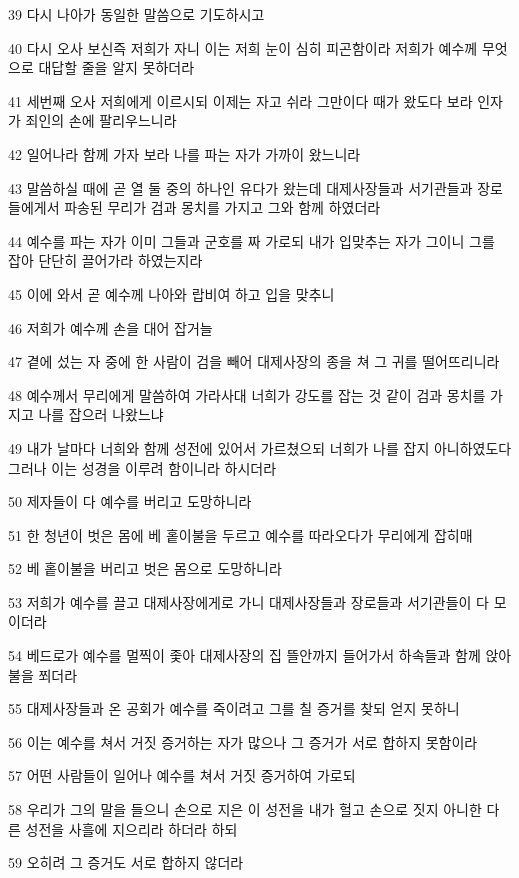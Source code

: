 \par 39 다시 나아가 동일한 말씀으로 기도하시고
\par 40 다시 오사 보신즉 저희가 자니 이는 저희 눈이 심히 피곤함이라 저희가 예수께 무엇으로 대답할 줄을 알지 못하더라
\par 41 세번째 오사 저희에게 이르시되 이제는 자고 쉬라 그만이다 때가 왔도다 보라 인자가 죄인의 손에 팔리우느니라
\par 42 일어나라 함께 가자 보라 나를 파는 자가 가까이 왔느니라
\par 43 말씀하실 때에 곧 열 둘 중의 하나인 유다가 왔는데 대제사장들과 서기관들과 장로들에게서 파송된 무리가 검과 몽치를 가지고 그와 함께 하였더라
\par 44 예수를 파는 자가 이미 그들과 군호를 짜 가로되 내가 입맞추는 자가 그이니 그를 잡아 단단히 끌어가라 하였는지라
\par 45 이에 와서 곧 예수께 나아와 랍비여 하고 입을 맞추니
\par 46 저희가 예수께 손을 대어 잡거늘
\par 47 곁에 섰는 자 중에 한 사람이 검을 빼어 대제사장의 종을 쳐 그 귀를 떨어뜨리니라
\par 48 예수께서 무리에게 말씀하여 가라사대 너희가 강도를 잡는 것 같이 검과 몽치를 가지고 나를 잡으러 나왔느냐
\par 49 내가 날마다 너희와 함께 성전에 있어서 가르쳤으되 너희가 나를 잡지 아니하였도다 그러나 이는 성경을 이루려 함이니라 하시더라
\par 50 제자들이 다 예수를 버리고 도망하니라
\par 51 한 청년이 벗은 몸에 베 홑이불을 두르고 예수를 따라오다가 무리에게 잡히매
\par 52 베 홑이불을 버리고 벗은 몸으로 도망하니라
\par 53 저희가 예수를 끌고 대제사장에게로 가니 대제사장들과 장로들과 서기관들이 다 모이더라
\par 54 베드로가 예수를 멀찍이 좇아 대제사장의 집 뜰안까지 들어가서 하속들과 함께 앉아 불을 쬐더라
\par 55 대제사장들과 온 공회가 예수를 죽이려고 그를 칠 증거를 찾되 얻지 못하니
\par 56 이는 예수를 쳐서 거짓 증거하는 자가 많으나 그 증거가 서로 합하지 못함이라
\par 57 어떤 사람들이 일어나 예수를 쳐서 거짓 증거하여 가로되
\par 58 우리가 그의 말을 들으니 손으로 지은 이 성전을 내가 헐고 손으로 짓지 아니한 다른 성전을 사흘에 지으리라 하더라 하되
\par 59 오히려 그 증거도 서로 합하지 않더라
